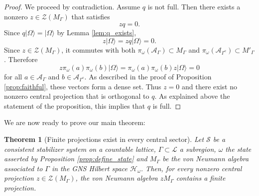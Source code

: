 \documentclass[aps,pra,reprint,superscriptaddress]{revtex4-2}
\newcommand{\cA}{{\mathcal A}}
\newcommand{\cH}{{\mathcal H}}
\newcommand{\cL}{{\mathcal L}}
\newcommand{\cS}{{\mathcal S}}
\newcommand{\cZ}{{\mathcal Z}}
\newcommand\G{\Gamma}
\newcommand\w{\omega}
\newcommand\W{\Omega}
\providecommand{\ket}[1]{\lvert #1\rangle}
\newtheorem{theorem}{Theorem}
\theoremstyle{definition}
\theoremstyle{remark}
\begin{document}
\begin{proof}
We proceed by contradiction. Assume $q$ is not full. Then there exists a nonzero
$z\in\mathcal Z(M_\G)$ that satisfies
\begin{equation}\label{eq:zq_vanishes}
  zq=0.
\end{equation}
Since $q\ket{\W}=\ket{\W}$ by Lemma \ref{lem:q_exists},
\begin{equation}\label{eq:zW_vanishes}
  z\ket{\W}=z q \ket{\W}=0.
\end{equation}
Since $z \in \cZ(M_\G)$, it commutes with both $\pi_\omega( \cA_\G)\subset
M_\G$ and $\pi_\omega(\cA_{\G^c})\subset M'_\G$.  Therefore
\begin{equation}
  z\pi_\w(a)\pi_\w(b)\ket{\W}
  =\pi_\w(a)\pi_\w(b)z\ket{\W}=0
\end{equation}
for all $a\in \cA_\G$ and $b\in \cA_{\G^c}$. As described in the proof of
Proposition \ref{prop:faithful}, these vectors form a dense set. Thus $z = 0$
and there exist no nonzero central projection that is orthogonal to $q$. As
explained above the statement of the proposition, this implies that $q$ is
full. 
\end{proof}
We are now ready to prove our main theorem:
\begin{theorem}[Finite projections exist in every central sector]\label{thm:finite_projections_exist}
    Let $\cS$ be a consistent stabilizer system on a countable lattice, $\G
    \subset \cL$ a subregion, $\w$ the state asserted by Proposition
    \ref{prop:define_state} and $M_\G$ be the von Neumann algebra associated to
    $\G$ in the GNS Hilbert space $\cH_\w$. Then, for every nonzero central
    projection $z \in \cZ(M_\G)$,
    the von Neumann algebra $zM_\G$ contains a finite projection.
\end{theorem}
\end{document}
